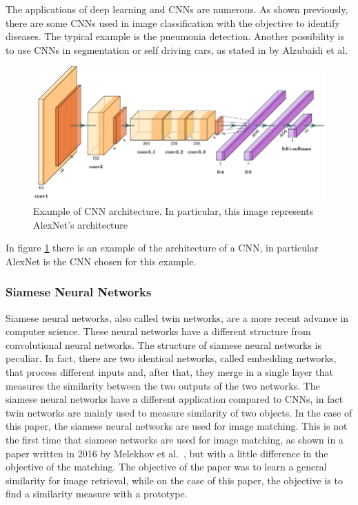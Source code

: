 \documentclass[conference]{IEEEtran}
\begin{document}
					\noindent The applications of deep learning and CNNs are numerous. As shown previously, there are some CNNs used in image classification with the objective to identify diseases. The typical example is 
					the pneumonia detection. Another possibility is to use CNNs in segmentation or self driving cars, as stated in \cite{alzubaidi2021review} by Alzubaidi et al.
			
					\begin{figure}[!ht]
						\centerline{\includegraphics[width=\linewidth]{imgs/cnn_architecture.png}}
						\caption{Example of CNN architecture. In particular, this image represents AlexNet's architecture}
						\label{fig:5}
					\end{figure}
					
					\noindent In figure \ref{fig:5} there is an example of the architecture of a CNN, in particular AlexNet is the CNN chosen for this example. 
					
				\subsubsection{Siamese Neural Networks}

					Siamese neural networks, also called twin networks, are a more recent advance in computer science. These neural networks have a different structure from convolutional neural networks. The 
					structure of siamese neural networks is peculiar. In fact, there are two identical networks, called embedding networks, that process different inputs and, after that, 
					they merge in a single layer that measures the similarity between 
					the two outputs of the two networks. The siamese neural networks have a different application compared to CNNs, in fact twin networks are mainly used to measure similarity of two objects. 
					In the case of this paper, the siamese neural networks are used for image matching. This is not the first time that siamese networks are used for image matching, as shown in a paper written in 2016 by 
					Melekhov et al.~\cite{melekhov2016siamese}, but with a little difference in the objective of the matching. The objective of the paper was to learn a general similarity for image retrieval, while on the case of this 
					paper, the objective is to find a similarity measure with a prototype. 
					
\end{document}
